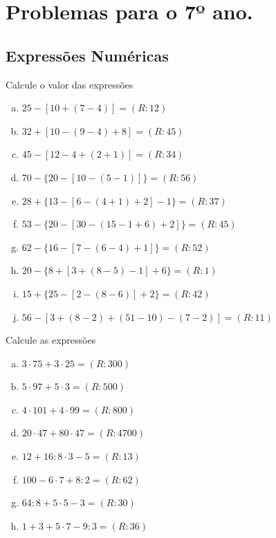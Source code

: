 \chapter{Problemas para o 7º ano.}
\section{Expressões Numéricas}

\item Calcule o valor das expressões
	\begin{multicols}{2}
	\begin{enumerate}[a)]
	\item $25-[10+(7-4)] =    (R:12)$
	\item $32+[10-(9-4)+8] =                         (R:45)$
	\item $45-[12-4+(2+1)] =                          (R:34)$
	\item $70-\{20-[10-(5-1)]\} =                     (R:56)$
	\item $28+\{13-[6-(4+1)+2]-1\} =              (R:37)$
	\item $53-\{20-[30-(15-1+6)+2]\} =           (R:45)$
	\item $62-\{16-[7-(6-4)+1]\} =                   (R:52)$
	\item $20-\{8+[3+(8-5)-1]+6\} =                (R:1)$
	\item $15+\{25-[2-(8-6)]+2\} =                   (R:42)$
	\item $56-[3+(8-2)+(51-10)-(7-2)] =          (R:11)$
	\end{enumerate}
	\end{multicols}

\item Calcule as expressões
	\begin{multicols}{2}
	\begin{enumerate}[a)]
		\item $3\cdot75+3\cdot25= (R:300)$
		\item $5\cdot97+5\cdot3= (R:500 )$
		\item $4\cdot101+4\cdot99= (R:800)$
		\item $20\cdot47+80\cdot47= (R:4700)$
		\item $12+16:8\cdot3-5= (R:13)$
		\item $100-6\cdot7+8:2 = (R:62)$
		\item $64:8+5\cdot5-3= (R: 30)$
		\item $1+3+5\cdot7-9:3 = (R:36)$
	\end{enumerate}
	\end{multicols}


